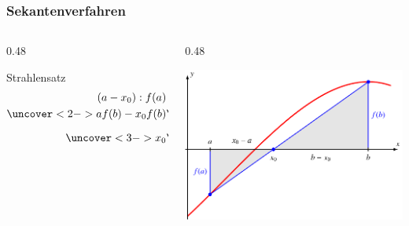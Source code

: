 %
%
%
\begin{frame}
\frametitle{Sekantenverfahren}
\vspace{-10pt}
\begin{columns}[t]
\begin{column}{0.48\hsize}
\begin{block}{Strahlensatz}
\vspace{-15pt}
\begin{align*}
(a-x_0) : f(a) &= (b-x_0) : f(b)
\\
\uncover<2->{af(b) -x_0f(b)}&\uncover<2->{= bf(a)-x_0f(a)}
\\
\uncover<3->{x_0}&\uncover<3->{=\frac{af(b)-bf(a)}{f(b)-f(a)}}
\end{align*}
\vspace{-15pt}
\end{block}
\end{column}
\begin{column}{0.48\hsize}
\begin{center}
\includegraphics[width=\hsize]{../../buch/chapters/20-gleichungen/figures/sekante.pdf}
\end{center}
\end{column}
\end{columns}
\end{frame}
